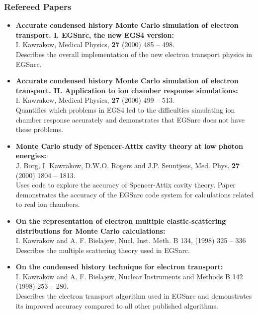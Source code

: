 \subsubsection{Refereed Papers}
\begin{itemize}
\item {\bfseries Accurate condensed history Monte Carlo simulation of
     electron transport. I. EGSnrc, the new EGS4 version:} \\
 I. Kawrakow, Medical Physics, {\bf 27} (2000) 485 -- 498.\\
Describes the overall implementation of the new electron transport
physics in EGSnrc.

\item {\bfseries Accurate condensed history Monte Carlo simulation of
     electron transport. II. Application to ion chamber response
     simulations:}\\
 I. Kawrakow, Medical Physics, {\bf 27} (2000) 499 -- 513.\\
Quantifies which problems in EGS4 led to the difficulties simulating ion
chamber response accurately and demonstrates that EGSnrc does not have
these problems.

\item {\bfseries Monte Carlo study of Spencer-Attix cavity theory at low
     photon energies:}\\
J. Borg, I. Kawrakow, D.W.O. Rogers and J.P.  Seuntjens, Med. Phys. {\bf
 27} (2000) 1804 -- 1813.
\\Uses code to explore the accuracy of Spencer-Attix cavity theory.
Paper demonstrates the accuracy of the EGSnrc code system for calculations
related to real ion chambers.


\item {\bfseries On the representation of electron multiple
elastic-scattering distributions for Monte Carlo calculations:}\\
I. Kawrakow and A. F.  Bielajew, Nucl. Inst. Meth. B 134, (1998) 325 --
336\\ Describes the multiple scattering theory used in EGSnrc.

\item {\bfseries On the condensed history technique for electron
transport:}\\
I. Kawrakow and A. F.  Bielajew, Nuclear Instruments and
Methods B 142 (1998) 253 -- 280.\\ Describes the electron transport
algorithm used in EGSnrc and demonstrates its improved accuracy compared
to all other published algorithms.


\end{itemize}
